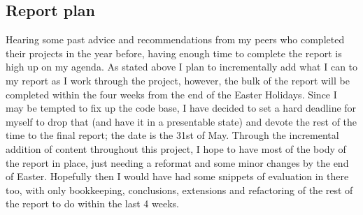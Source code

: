 \documentclass[11pt]{report}
\begin{document}
\subsection*{Report plan}
Hearing some past advice and recommendations from my peers who completed their 
projects in the year before, having enough time to complete the report is high up
on my agenda. As stated above I plan to incrementally add what I can to my report
as I work through the project, however, the bulk of the report will be completed
within the four weeks from the end of the Easter Holidays. Since I may be
tempted to fix up the code base, I have decided to set a hard deadline for myself 
to drop that (and have it in a presentable state) and devote the rest of the time
to the final report; the date is the 31st of May. Through the incremental addition
of content throughout this project, I hope to have most of the body of the report
in place, just needing a reformat and some minor changes by the end of Easter. 
Hopefully then I would have had some snippets of evaluation in there too, with only
bookkeeping, conclusions, extensions and refactoring of the rest of the report to
do within the last 4 weeks.
\end{document}
